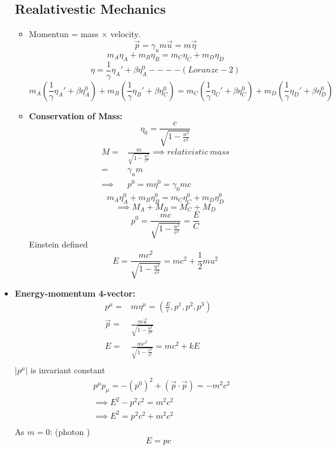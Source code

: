 \documentclass[fleqn,a4paper,12pt]{article}
\begin{document}
\begin{itemize}
\begin{itemize}
          
        
    \end{itemize}
    
\subsection{Realativestic Mechanics}
\begin{itemize}
\item
  Momentun = mass $\times$ velocity.
  \[ \overrightarrow{p} = \gamma_u m \overrightarrow{u} = m \overrightarrow{\eta} \]
  \[ m_A \eta_A + m_B \eta_B = m_C \eta_C + m_D \eta_D \]
  \[ \eta = \frac{1}{\gamma} \eta_A' + \beta \eta_A^0  ----(Loranze-2) \]
  \[ m_A( \frac{1}{\gamma} \eta_A' + \beta \eta_A^0 ) + m_B ( \frac{1}{\gamma} \eta_B' + \beta \eta_C^0 ) = m_C ( \frac{1}{\gamma} \eta_C' + \beta \eta_C^0 ) + m_D ( \frac{1}{\gamma} \eta_D' + \beta \eta_D^0 )  \]
\item \textbf{Conservation of Mass:}\\
  \[ \eta_0 = \frac{c}{ \sqrt{ 1 - \frac{u^2}{c^2} } } \]
  \begin{align*}
    M =& \frac{m}{ \sqrt{ 1 - \frac{u^2}{c^2} } } \implies relativistic\ mass \\
    =& \gamma_u m\\
    \implies& p^0 = m \eta^0 = \gamma_0 m c
  \end{align*}
  \[ m_A\eta_A^0 + m_B\eta_B^0 = m_C\eta_C^0 + m_D\eta_D^0 \]  
  \[ \implies M_A + M_B = M_C + M_D \]
  \[ p^0 = \frac{ mc }{ \sqrt{ 1 - \frac{u^2}{c^2} } } = \frac{ E }{ C } \]
  Einstein defined
  \[E = \frac{ mc^2 }{ \sqrt{ 1 - \frac{u^2}{c^2} } }  = mc^2 + \frac{1}{2} m u^2 \]
\end{itemize}
\item
  \textbf{Energy-momentum 4-vector:}\\
  \begin{align*}
    p^{\mu} =& m \eta ^ {\mu} = ( \frac{E}{c} , p^1, p^2, p^3 )\\
    \overrightarrow p =& \frac{ m \overrightarrow{u} }{ \sqrt{ 1 - \frac{u^2}{c^2} } }\\
    E =& \frac{mc^2}{{\sqrt{ 1 - \frac{v^2}{c^2} } } } = mc^2 + kE\\
  \end{align*}
  $| p^{\mu} |$ is invariant constant\\
  \begin{align*}
    &p^{\mu}p_{\mu} = - (p^0)^2 + ( \overrightarrow{p} \cdot \overrightarrow{p} ) = -m^2c^2 \\
    &\implies E^2 - p^2c^2 = m^2c^2\\
    &\implies E^2 = p^2c^2 + m^2c^2 \\
  \end{align*}
  As $m=0$: (photon )
  \[ E=pc \]
  

\end{itemize}
\end{document}
